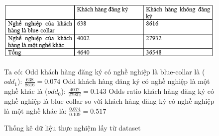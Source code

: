 \documentclass{report}
\newcommand\tab[1][1.25cm]{\hspace*{#1}}
\begin{document}
        \begin{center}
            \begin{figure}[htp]
                \begin{center}
                    \includegraphics[scale = 1]{image/datathucnghiem.PNG}
                \end{center}
                \caption{Thống kê dữ liệu thực nghiệm lấy từ dataset}
                \fontsize{13}{15}\selectfont Ta có:
                    \vspace{0.2cm}\newline\tab[1cm] Odd khách hàng đăng ký có nghề nghiệp là blue-collar là ($odd_1$): $\frac{638}{8616} = 0.074$
                    \vspace{0.2cm}\newline\tab[1cm] Odd khách hàng đăng ký có nghề nghiệp là một nghề khác là ($odd_0$): $\frac{4002}{27932} = 0.143$
                    \vspace{0.2cm}\newline\tab[1cm] Odds ratio khách hàng đăng ký có nghề nghiệp là blue-collar so với khách hàng đăng ký có nghề nghiệp là một nghề khác là: $\frac{0.074}{0.109} = 0.517$\\
            \end{figure}
        \end{center}
        
        \pagebreak
    
\end{document}
